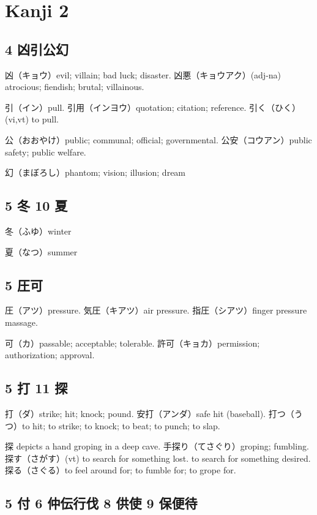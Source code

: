 \chapter{Kanji 2}

\section{4 凶引公幻}

凶（キョウ）evil; villain; bad luck; disaster.
凶悪（キョウアク）(adj-na) atrocious; fiendish; brutal; villainous.

引（イン）pull.
引用（インヨウ）quotation; citation; reference.
引く（ひく）(vi,vt) to pull.

公（おおやけ）public; communal; official; governmental.
公安（コウアン）public safety; public welfare.

幻（まぼろし）phantom; vision; illusion; dream

\section{5 冬 10 夏}

冬（ふゆ）winter

夏（なつ）summer

\section{5 圧可}

圧（アツ）pressure.
気圧（キアツ）air pressure.
指圧（シアツ）finger pressure massage.

可（カ）passable; acceptable; tolerable.
許可（キョカ）permission; authorization; approval.

\section{5 打 11 探}

打（ダ）strike; hit; knock; pound.
安打（アンダ）safe hit (baseball).
打つ（うつ）to hit; to strike; to knock; to beat; to punch; to slap.

探 depicts a hand groping in a deep cave.
手探り（てさぐり）groping; fumbling.
探す（さがす）(vt)
to search for something lost.
to search for something desired.
探る（さぐる）to feel around for; to fumble for; to grope for.

\section{5 付 6 仲伝行伐 8 供使 9 保便待}


